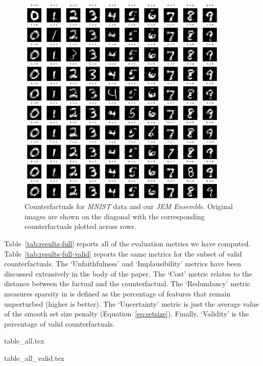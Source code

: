 \documentclass{article}
\begin{document}
\begin{figure}
  \centering
  \includegraphics[width=0.9\textwidth]{../artifacts/results/images/mnist_eccco_all_digits.png}
  \caption{Counterfactuals for \textit{MNIST} data and our \textit{JEM Ensemble}. Original images are shown on the diagonal with the corresponding counterfactuals plotted across rows.}\label{fig:mnist-eccco}
\end{figure}

Table~\ref{tab:results-full} reports all of the evaluation metrics we have computed. Table~\ref{tab:results-full-valid} reports the same metrics for the subset of valid counterfactuals. The `Unfaithfulness' and `Implausibility' metrics have been discussed extensively in the body of the paper. The `Cost' metric relates to the distance between the factual and the counterfactual. The `Redundancy' metric measures sparsity in is defined as the percentage of features that remain unperturbed (higher is better). The `Uncertainty' metric is just the average value of the smooth set size penalty (Equation~\ref{eq:setsize}). Finally, `Validity' is the percentage of valid counterfactuals. 

{table_all.tex}

{table_all_valid.tex}
\end{document}
